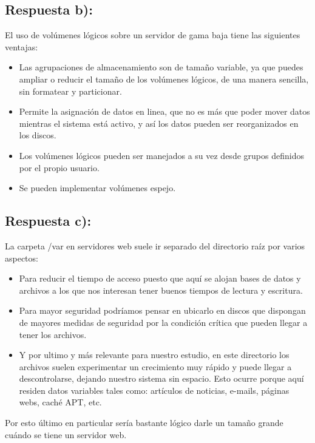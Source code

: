  \subsection{Respuesta b):}
 El uso de volúmenes lógicos sobre un servidor de gama baja tiene las siguientes ventajas:\cite{RedHatVentajasLVM}
 \begin{itemize}
 	\item Las agrupaciones de almacenamiento son de tamaño variable, ya que puedes ampliar o reducir el tamaño de los volúmenes lógicos, de una manera sencilla, sin formatear y particionar.
 	\item Permite la asignación de datos en linea, que no es más que poder mover datos mientras el sistema está activo, y así los datos pueden ser reorganizados en los discos.
 	\item Los volúmenes lógicos pueden ser manejados a su vez desde grupos  definidos por el propio usuario.
 	\item Se pueden implementar volúmenes espejo.
 \end{itemize}
 \subsection{Respuesta c):}
 La carpeta /var en servidores web suele ir separado del directorio raíz por varios aspectos:
 \begin{itemize}
 	\item Para reducir el tiempo de acceso puesto que aquí se alojan bases de datos y archivos a los que nos interesan tener buenos tiempos de lectura y escritura.
 	\item Para mayor seguridad podríamos pensar en ubicarlo en discos que dispongan de mayores medidas de seguridad por la  condición crítica que pueden llegar a tener los archivos.
 	\item Y por ultimo y más relevante para nuestro estudio, en este directorio los archivos suelen experimentar un crecimiento muy rápido y puede llegar a descontrolarse, dejando nuestro sistema sin espacio. Esto ocurre porque aquí residen datos variables tales como: artículos de noticias, e-mails, páginas webs, caché APT, etc.\cite{cuestion7C}
 	\end{itemize}
 	Por esto último en particular sería bastante lógico darle un tamaño grande cuándo se tiene un servidor web.

